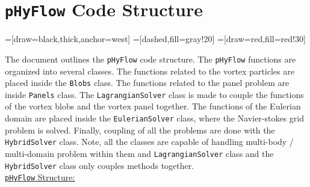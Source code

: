 
\chapter{\texttt{pHyFlow} Code Structure}
\label{app:code}%

=[draw=black,thick,anchor=west]
=[dashed,fill=gray!20]
=[draw=red,fill=red!30]



%
The document outlines the \texttt{pHyFlow} code structure. The \texttt{pHyFlow} functions are organized into several classes. The functions related to the vortex particles are placed inside the \texttt{Blobs} class. The functions related to the panel problem are inside \texttt{Panels} class. The \texttt{LagrangianSolver} class is made to couple the functions of the vortex blobs and the vortex panel together. The functions of the Eulerian domain are placed inside the \texttt{EulerianSolver} class, where the Navier-stokes grid problem is solved. Finally, coupling of all the problems are done with the \texttt{HybridSolver} class. Note, all the classes are capable of handling multi-body / multi-domain problem within them and \texttt{LagrangianSolver} class and the \texttt{HybridSolver} class only couples methods together.\\

\underline{\texttt{pHyFlow} Structure:}
\begin{figure}[h]
\centering
{}
\end{figure}
\newpage

